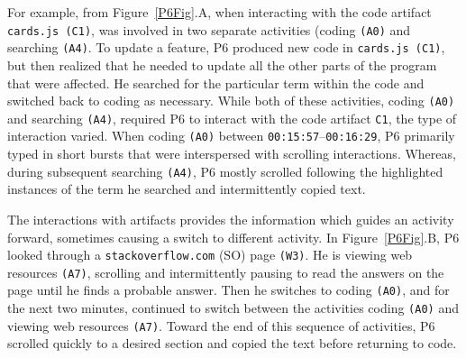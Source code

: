 For example, from Figure~\ref{P6Fig}.A, when interacting with the code artifact \texttt{cards.js (C1)}, was involved in two separate activities (coding \texttt{(A0)} and searching \texttt{(A4)}. To update a feature, P6 produced new code in \texttt{cards.js (C1)}, but then realized that he needed to update all the other parts of the program that were affected. He searched for the particular term within the code and switched back to coding as necessary. While both of these activities, coding \texttt{(A0)} and searching \texttt{(A4)}, required P6 to interact with the code artifact \texttt{C1}, the type of interaction varied. When coding \texttt{(A0)} between \texttt{00:15:57}--\texttt{00:16:29}, P6 primarily typed in short bursts that were interspersed with scrolling interactions. Whereas, during subsequent searching \texttt{(A4)}, P6 mostly scrolled following the highlighted instances of the term he searched and intermittently copied text.


The interactions with artifacts provides the information which guides an activity forward, sometimes causing a switch to different activity. In Figure~\ref{P6Fig}.B, P6 looked through a \texttt{stackoverflow.com} (SO) page \texttt{(W3)}. He is viewing web resources \texttt{(A7)}, scrolling and intermittently pausing to read the answers on the page until he finds a probable answer. Then he switches to coding \texttt{(A0)}, and for the next two minutes, continued to switch between the activities coding \texttt{(A0)} and viewing web resources \texttt{(A7)}. Toward the end of this sequence of activities, P6 scrolled quickly to a desired section and copied the text before returning to code.

